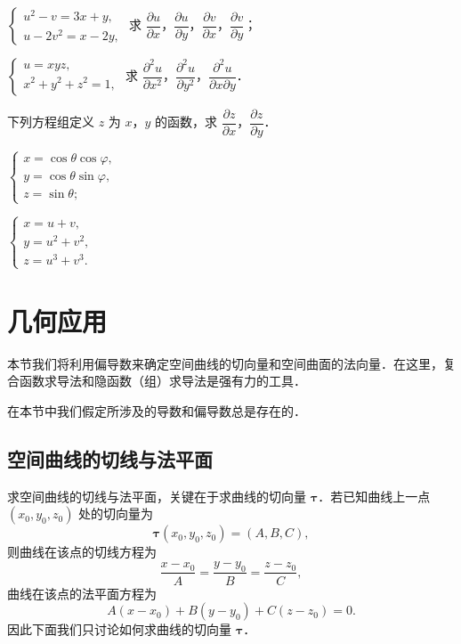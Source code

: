 \begin{xiti}
\begin{ziti}
\item $\left\{\begin{array}{l}u^{2}-v=3x+y,\\ u-2v^{2}=x-2y,\end{array}\right.$ 求 $\dfrac{\partial u}{\partial x}$，$\dfrac{\partial u}{\partial y}$，$\dfrac{\partial v}{\partial x}$，$\dfrac{\partial v}{\partial y}$；
\item $\left\{\begin{array}{l}u=xyz,\\ x^{2}+y^{2}+z^{2}=1,\end{array}\right.$ 求 $\dfrac{\partial^{2}u}{\partial x^{2}}$，$\dfrac{\partial^{2}u}{\partial y^{2}}$，$\dfrac{\partial^{2}u}{\partial x\partial y}$．
\end{ziti}
\item 下列方程组定义 $z$ 为 $x$，$y$ 的函数，求 $\dfrac{\partial z}{\partial x}$，$\dfrac{\partial z}{\partial y}$．
\begin{ziti}
\item $\left\{\begin{array}{l}x=\cos\theta\cos\varphi,\\ y=\cos\theta\sin\varphi,\\ z=\sin\theta;\end{array}\right.$
\item $\left\{\begin{array}{l}x=u+v,\\ y=u^{2}+v^{2},\\ z=u^{3}+v^{3}.\end{array}\right.$
\end{ziti}
\end{xiti}

\section{几何应用}

本节我们将利用偏导数来确定空间曲线的切向量和空间曲面的法向量．在这里，复合函数求导法和隐函数（组）求导法是强有力的工具．

在本节中我们假定所涉及的导数和偏导数总是存在的．

\subsection{空间曲线的切线与法平面}

求空间曲线的切线与法平面，关键在于求曲线的切向量 $\bm{\tau}$．若已知曲线上一点 $(x_{0},y_{0},z_{0})$ 处的切向量为
\[
\bm{\tau}(x_{0},y_{0},z_{0})=(A,B,C),
\]
则曲线在该点的切线方程为
\[
\frac{x-x_{0}}{A}=\frac{y-y_{0}}{B}=\frac{z-z_{0}}{C},
\]
曲线在该点的法平面方程为
\[
A(x-x_{0})+B(y-y_{0})+C(z-z_{0})=0.
\]
因此下面我们只讨论如何求曲线的切向量 $\bm{\tau}$．

